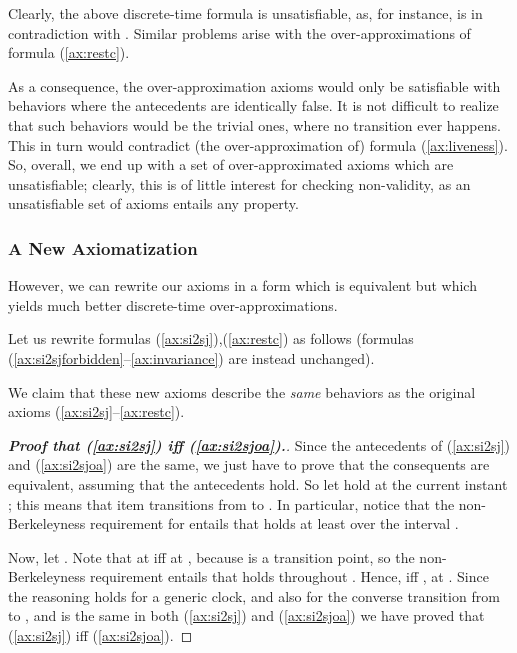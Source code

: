 \documentclass[a4paper]{article}
\newcommand{\frf}[1]{(\ref{#1})}
\newcommand{\fsrf}[2]{(\ref{#1}--\ref{#2})}
\theoremstyle{plain}
\theoremstyle{definition}
\begin{document}
Clearly, the above discrete-time formula is unsatisfiable, as, for instance,  is in contradiction with .
Similar problems arise with the over-ap\-prox\-i\-ma\-tions of formula \frf{ax:restc}.

As a consequence, the over-ap\-prox\-i\-ma\-tion axioms would only be satisfiable with behaviors where the antecedents are identically false.
It is not difficult to realize that such behaviors would be the trivial ones, where no transition ever happens.
This in turn would contradict (the over-ap\-prox\-i\-ma\-tion of) formula \frf{ax:liveness}.
So, overall, we end up with a set of over-approximated axioms which are unsatisfiable; clearly, this is of little interest for checking non-validity, as an unsatisfiable set of axioms entails any property.



\subsubsection{A New Axiomatization}
However, we can rewrite our axioms in a form which is equivalent but which yields much better discrete-time over-ap\-prox\-i\-ma\-tions.

Let us rewrite formulas \frf{ax:si2sj},\frf{ax:restc} as follows (formulas \fsrf{ax:si2sjforbidden}{ax:invariance} are instead unchanged).






We claim that these new axioms describe the \emph{same} behaviors as the original axioms \fsrf{ax:si2sj}{ax:restc}.

\begin{proof}[\textbf{Proof that \frf{ax:si2sj} iff \frf{ax:si2sjoa}.}]
Since the antecedents of \frf{ax:si2sj} and \frf{ax:si2sjoa} are the same, we just have to prove that the consequents are equivalent, assuming that the antecedents hold.
So let  hold at the current instant ; this means that item  transitions from  to .
In particular, notice that the non-Berkeleyness requirement for  entails that  holds at least over the interval .

Now, let .
Note that  at  iff  at , because  is a transition point, so the non-Berkeleyness requirement entails that  holds throughout .
Hence,  iff , at .
Since the reasoning holds for a generic clock, and also for the converse transition from  to , and  is the same in both \frf{ax:si2sj} and \frf{ax:si2sjoa} we have proved that \frf{ax:si2sj} iff \frf{ax:si2sjoa}.
\end{proof}
\end{document}
